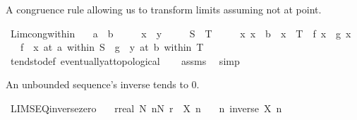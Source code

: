 \begin{isabellebody}
\begin{isamarkuptext}
A congruence rule allowing us to transform limits assuming not at point.%
\end{isamarkuptext}\isamarkuptrue%
\isamarkupfalse%
\ Lim{\isacharunderscore}{\kern0pt}cong{\isacharunderscore}{\kern0pt}within{\isacharcolon}{\kern0pt}\isanewline
\ \ \ {\isachardoublequoteopen}a\ {\isacharequal}{\kern0pt}\ b{\isachardoublequoteclose}\isanewline
\ \ \ \ \ {\isachardoublequoteopen}x\ {\isacharequal}{\kern0pt}\ y{\isachardoublequoteclose}\isanewline
\ \ \ \ \ {\isachardoublequoteopen}S\ {\isacharequal}{\kern0pt}\ T{\isachardoublequoteclose}\isanewline
\ \ \ \ \ {\isachardoublequoteopen}{\isasymAnd}x{\isachardot}{\kern0pt}\ x\ {\isasymnoteq}\ b\ {\isasymLongrightarrow}\ x\ {\isasymin}\ T\ {\isasymLongrightarrow}\ f\ x\ {\isacharequal}{\kern0pt}\ g\ x{\isachardoublequoteclose}\isanewline
\ \ \ {\isachardoublequoteopen}{\isacharparenleft}{\kern0pt}f\ {\isasymlonglongrightarrow}\ x{\isacharparenright}{\kern0pt}\ {\isacharparenleft}{\kern0pt}at\ a\ within\ S{\isacharparenright}{\kern0pt}\ {\isasymlongleftrightarrow}\ {\isacharparenleft}{\kern0pt}g\ {\isasymlonglongrightarrow}\ y{\isacharparenright}{\kern0pt}\ {\isacharparenleft}{\kern0pt}at\ b\ within\ T{\isacharparenright}{\kern0pt}{\isachardoublequoteclose}\isanewline
%
\isadelimproof
\ \ %
\endisadelimproof
%
\isatagproof
{}\isamarkupfalse%
\ tendsto{\isacharunderscore}{\kern0pt}def\ eventually{\isacharunderscore}{\kern0pt}at{\isacharunderscore}{\kern0pt}topological\isanewline
\ \ \isamarkupfalse%
\ assms\ \isamarkupfalse%
\ simp%
\endisatagproof
{\isafoldproof}%
%
\isadelimproof
%
\endisadelimproof
%
\begin{isamarkuptext}%
An unbounded sequence's inverse tends to 0.%
\end{isamarkuptext}\isamarkuptrue%
\isamarkupfalse%
\ LIMSEQ{\isacharunderscore}{\kern0pt}inverse{\isacharunderscore}{\kern0pt}zero{\isacharcolon}{\kern0pt}\isanewline
\ \ \ {\isachardoublequoteopen}{\isasymAnd}r{\isacharcolon}{\kern0pt}{\isacharcolon}{\kern0pt}real{\isachardot}{\kern0pt}\ {\isasymexists}N{\isachardot}{\kern0pt}\ {\isasymforall}n{\isasymge}N{\isachardot}{\kern0pt}\ r\ {\isacharless}{\kern0pt}\ X\ n{\isachardoublequoteclose}\isanewline
\ \ \ {\isachardoublequoteopen}{\isacharparenleft}{\kern0pt}{\isasymlambda}n{\isachardot}{\kern0pt}\ inverse\ {\isacharparenleft}{\kern0pt}X\ n{\isacharparenright}{\kern0pt}{\isacharparenright}{\kern0pt}\ {\isasymlonglonglongrightarrow}\ {}{\isachardoublequoteclose}\isanewline

\end{isabellebody}
